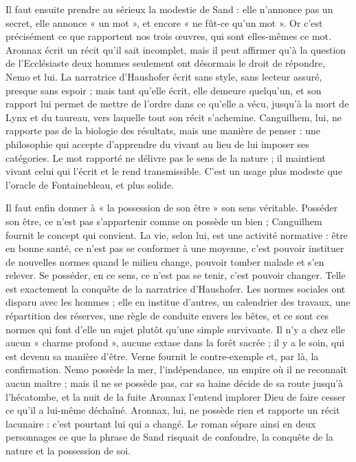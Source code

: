 \documentclass[11pt,a4paper]{article}
\begin{document}
Il faut ensuite prendre au sérieux la modestie de Sand : elle n'annonce pas un secret, elle annonce « un mot », et encore « ne fût-ce qu'un mot ». Or c'est précisément ce que rapportent nos trois œuvres, qui sont elles-mêmes ce mot. Aronnax écrit un récit qu'il sait incomplet, mais il peut affirmer qu'à la question de l'Ecclésiaste deux hommes seulement ont désormais le droit de répondre, Nemo et lui. La narratrice d'Haushofer écrit sans style, sans lecteur assuré, presque sans espoir ; mais tant qu'elle écrit, elle demeure quelqu'un, et son rapport lui permet de mettre de l'ordre dans ce qu'elle a vécu, jusqu'à la mort de Lynx et du taureau, vers laquelle tout son récit s'achemine. Canguilhem, lui, ne rapporte pas de la biologie des résultats, mais une manière de penser : une philosophie qui accepte d'apprendre du vivant au lieu de lui imposer ses catégories. Le mot rapporté ne délivre pas le sens de la nature ; il maintient vivant celui qui l'écrit et le rend transmissible. C'est un usage plus modeste que l'oracle de Fontainebleau, et plus solide.

Il faut enfin donner à « la possession de son être » son sens véritable. Posséder son être, ce n'est pas s'appartenir comme on possède un bien ; Canguilhem fournit le concept qui convient. La vie, selon lui, est une activité normative : être en bonne santé, ce n'est pas se conformer à une moyenne, c'est pouvoir instituer de nouvelles normes quand le milieu change, pouvoir tomber malade et s'en relever. Se posséder, en ce sens, ce n'est pas se tenir, c'est pouvoir changer. Telle est exactement la conquête de la narratrice d'Haushofer. Les normes sociales ont disparu avec les hommes ; elle en institue d'autres, un calendrier des travaux, une répartition des réserves, une règle de conduite envers les bêtes, et ce sont ces normes qui font d'elle un sujet plutôt qu'une simple survivante. Il n'y a chez elle aucun « charme profond », aucune extase dans la forêt sacrée ; il y a le soin, qui est devenu sa manière d'être. Verne fournit le contre-exemple et, par là, la confirmation. Nemo possède la mer, l'indépendance, un empire où il ne reconnaît aucun maître ; mais il ne se possède pas, car sa haine décide de sa route jusqu'à l'hécatombe, et la nuit de la fuite Aronnax l'entend implorer Dieu de faire cesser ce qu'il a lui-même déchaîné. Aronnax, lui, ne possède rien et rapporte un récit lacunaire : c'est pourtant lui qui a changé. Le roman sépare ainsi en deux personnages ce que la phrase de Sand risquait de confondre, la conquête de la nature et la possession de soi.
\end{document}
